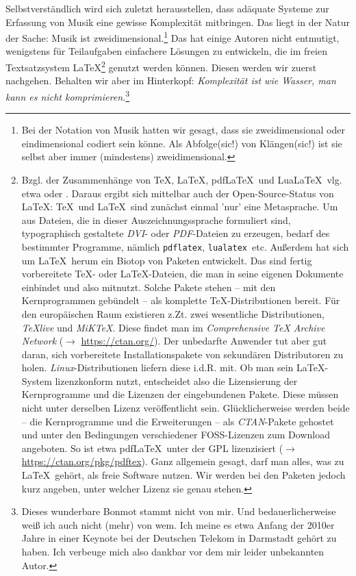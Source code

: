 \documentclass[
  DIV=calc,
  BCOR=5mm,
  12pt,
  headings=small,
  twoside,
  abstract=true,
  toc=bib,
  xcolor=dvipsnames,
  english,ngerman]{scrartcl}
\newcommand{\acc}[0]{\textit}
\begin{document}
Selbstverständlich wird sich zuletzt herausstellen, dass adäquate Systeme zur
Erfassung von Musik eine gewisse Komplexität mitbringen. Das liegt in der Natur
der Sache: Musik ist zweidimensional.\footnote{Bei der Notation von Musik hatten
wir gesagt, dass sie zweidimensional oder eindimensional codiert sein könne.
Als Abfolge(sic!) von Klängen(sic!) ist sie selbst aber immer (mindestens)
zweidimensional.} Das hat einige Autoren nicht entmutigt, wenigstens für
Teilaufgaben einfachere Lösungen zu entwickeln, die im freien Textsatzsystem
\LaTeX\footnote{Bzgl. der Zusammenhänge von \TeX, \LaTeX, pdf\LaTeX\ und
Lua\LaTeX\ vlg. etwa \cite[][7ff]{Voss2018a} oder \cite[][8ff]{Voss2012a}.
Daraus ergibt sich mittelbar auch der Open-Source-Status von \LaTeX: \TeX\ und
\LaTeX\ sind zunächst einmal 'nur' eine Metasprache. Um aus Dateien, die in
dieser Auszeichnungssprache formuliert sind, typographisch gestaltete \acc{DVI}-
oder \acc{PDF}-Dateien zu erzeugen, bedarf des bestimmter Programme, nämlich
\texttt{pdflatex}, \texttt{lualatex}\ etc. Außerdem hat sich um \LaTeX\ herum ein
Biotop von Paketen entwickelt. Das sind fertig vorbereitete \TeX- oder
\LaTeX-Dateien, die man in seine eigenen Dokumente einbindet und also mitnutzt.
Solche Pakete stehen -- mit den Kernprogrammen gebündelt -- als komplette
\TeX-Distributionen bereit. Für den europäischen Raum existieren z.Zt. zwei
wesentliche Distributionen, \acc{{\TeX}live} und \acc{MiK{\TeX}}. Diese findet
man im \acc{Comprehensive TeX Archive Network} ($\rightarrow$
\href{https://ctan.org/}{https://ctan.org/}). Der unbedarfte Anwender tut aber
gut daran, sich vorbereitete Installationspakete von sekundären Distributoren zu
holen. \acc{Linux}-Distributionen liefern diese i.d.R. mit. Ob man sein
\LaTeX-System lizenzkonform nutzt, entscheidet also die Lizensierung der
Kernprogramme und die Lizenzen der eingebundenen Pakete. Diese müssen nicht
unter derselben Lizenz veröffentlicht sein. Glücklicherweise werden beide -- die
Kernprogramme und die Erweiterungen -- als \acc{CTAN}-Pakete gehostet und unter
den Bedingungen verschiedener FOSS-Lizenzen zum Download angeboten. So ist etwa
pdf\LaTeX\ unter der GPL lizenzisiert ($\rightarrow$
\href{https://ctan.org/pkg/pdftex} {https://ctan.org/pkg/pdftex}). Ganz
allgemein gesagt, darf man alles, was zu \LaTeX\ gehört, als freie Software
nutzen. Wir werden bei den Paketen jedoch kurz angeben, unter welcher Lizenz sie
genau stehen.} genutzt werden können.
Diesen werden wir zuerst nachgehen. Behalten wir aber im Hinterkopf:
\acc{Komplexität ist wie Wasser, man kann es nicht
komprimieren.}\footnote{Dieses wunderbare Bonmot stammt nicht von mir. Und
bedauerlicherweise weiß ich auch nicht (mehr) von wem. Ich meine es etwa Anfang
der 2010er Jahre in einer Keynote bei der Deutschen Telekom in Darmstadt gehört
zu haben. Ich verbeuge mich also dankbar vor dem mir leider unbekannten Autor.}
\end{document}

